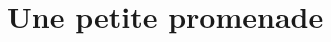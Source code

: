 \documentclass{article}
\begin{document}
    \section*{Une petite promenade}



    
\end{document}
